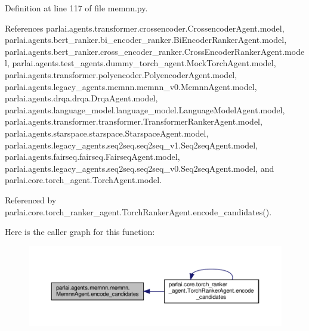 Definition at line 117 of file memnn.\+py.



References parlai.\+agents.\+transformer.\+crossencoder.\+Crossencoder\+Agent.\+model, parlai.\+agents.\+bert\+\_\+ranker.\+bi\+\_\+encoder\+\_\+ranker.\+Bi\+Encoder\+Ranker\+Agent.\+model, parlai.\+agents.\+bert\+\_\+ranker.\+cross\+\_\+encoder\+\_\+ranker.\+Cross\+Encoder\+Ranker\+Agent.\+model, parlai.\+agents.\+test\+\_\+agents.\+dummy\+\_\+torch\+\_\+agent.\+Mock\+Torch\+Agent.\+model, parlai.\+agents.\+transformer.\+polyencoder.\+Polyencoder\+Agent.\+model, parlai.\+agents.\+legacy\+\_\+agents.\+memnn.\+memnn\+\_\+v0.\+Memnn\+Agent.\+model, parlai.\+agents.\+drqa.\+drqa.\+Drqa\+Agent.\+model, parlai.\+agents.\+language\+\_\+model.\+language\+\_\+model.\+Language\+Model\+Agent.\+model, parlai.\+agents.\+transformer.\+transformer.\+Transformer\+Ranker\+Agent.\+model, parlai.\+agents.\+starspace.\+starspace.\+Starspace\+Agent.\+model, parlai.\+agents.\+legacy\+\_\+agents.\+seq2seq.\+seq2seq\+\_\+v1.\+Seq2seq\+Agent.\+model, parlai.\+agents.\+fairseq.\+fairseq.\+Fairseq\+Agent.\+model, parlai.\+agents.\+legacy\+\_\+agents.\+seq2seq.\+seq2seq\+\_\+v0.\+Seq2seq\+Agent.\+model, and parlai.\+core.\+torch\+\_\+agent.\+Torch\+Agent.\+model.



Referenced by parlai.\+core.\+torch\+\_\+ranker\+\_\+agent.\+Torch\+Ranker\+Agent.\+encode\+\_\+candidates().

Here is the caller graph for this function\+:
\nopagebreak
\begin{figure}[H]
\begin{center}
\leavevmode
\includegraphics[width=350pt]{classparlai_1_1agents_1_1memnn_1_1memnn_1_1MemnnAgent_ab0c47ca129aeec437446202c941e0a56_icgraph}
\end{center}
\end{figure}
\mbox{\label{classparlai_1_1agents_1_1memnn_1_1memnn_1_1MemnnAgent_ae6e06364ccf919d70064d5966e5c1cf3}} 
